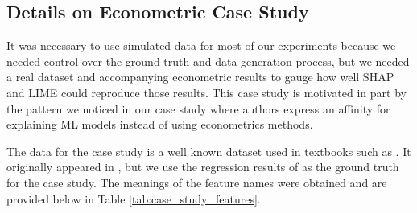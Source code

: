\documentclass[mnsc,blindrev]{informs3}
\begin{document}
    
    

    
    
    \subsection{Details on Econometric Case Study}
        \label{apx_sec:econometric_details}
        It was necessary to use simulated data for most of our experiments because we needed control over the ground truth and data generation process, but we needed a real dataset and accompanying econometric results to gauge how well SHAP and LIME could reproduce those results. This case study is motivated in part by the pattern we noticed in our case study where authors express an affinity for explaining ML models instead of using econometrics methods. 
        
        The data for the case study is a well known dataset used in textbooks such as \cite{}. It originally appeared in \cite{}, but we use the regression results of \cite{} as the ground truth for the case study. The meanings of the feature names were obtained \citep{HunterWilliamC1996Tcah} and are provided below in Table \ref{tab:case_study_features}.
        
\end{document}
